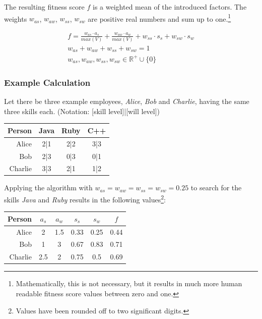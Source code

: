 The resulting fitness score $f$ is a weighted mean of the introduced factors. The weights $w_{as}$, $w_{aw}$, $w_{ss}$, $w_{sw}$ are positive real numbers and sum up to one.\footnote{Mathematically, this is not necessary, but it results in much more human readable fitness score values between zero and one.}

\begin{gather*}
  f = \frac{w_{as} \cdot a_s}{max(V)} + \frac{w_{aw} \cdot a_w}{ max(V)} + w_{ss} \cdot s_s + w_{sw} \cdot s_w \\
  w_{as} + w_{aw} + w_{ss} + w_{sw} = 1 \\
  w_{as}, w_{aw}, w_{ss}, w_{sw} \in \mathbb{R}^{+} \cup \{0\}
\end{gather*}

\newpage

\subsubsection{Example Calculation}
Let there be three example employees, \textit{Alice}, \textit{Bob} and \textit{Charlie}, having the same three skills each.
(Notation: [skill level]|[will level])
\label{example-fitness}
\newline
\newline
\begin{center}
\begin{tabular}{r|ccc}
  Person  & Java & Ruby & C++ \\
  \hline
  Alice   & 2|1  & 2|2 & 3|3 \\
  Bob     & 2|3  & 0|3 & 0|1 \\
  Charlie & 3|3  & 2|1 & 1|2 \\
\end{tabular}
\end{center}

Applying the algorithm with $w_{as} = w_{aw} = w_{ss} = w_{sw} = 0.25$ to search for the skills \textit{Java} and \textit{Ruby} results in the following values\footnote{Values have been rounded off to two significant digits.}:


\begin{center}
\begin{tabular}{r|cccc|c}
  Person  & $a_s$ & $a_w$ & $s_s$ & $s_w$ & $f$\\
  \hline
  Alice   & 2   & 1.5 & 0.33 & 0.25 & 0.44\\
  Bob     & 1   & 3   & 0.67 & 0.83 & 0.71\\
  Charlie & 2.5 & 2   & 0.75 & 0.5  & 0.69\\
\end{tabular}
\end{center}

